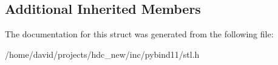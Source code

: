 \subsection*{Additional Inherited Members}


The documentation for this struct was generated from the following file\+:\begin{DoxyCompactItemize}
\item 
/home/david/projects/hdc\+\_\+new/inc/pybind11/stl.\+h\end{DoxyCompactItemize}
